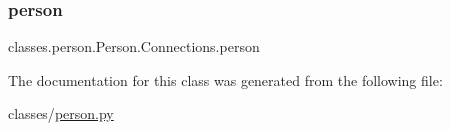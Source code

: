\subsubsection{\texorpdfstring{person}{person}}
{\footnotesize\ttfamily classes.\+person.\+Person.\+Connections.\+person}



The documentation for this class was generated from the following file\+:\begin{DoxyCompactItemize}
\item 
classes/\hyperlink{person_8py}{person.\+py}\end{DoxyCompactItemize}
